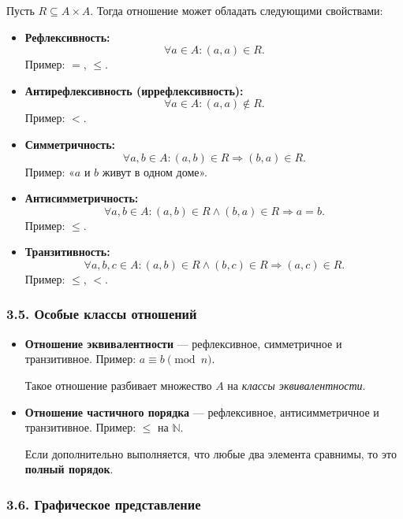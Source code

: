 Пусть $R \subseteq A \times A$. Тогда отношение может обладать следующими свойствами:

\begin{itemize}[leftmargin=*]
  \item \textbf{Рефлексивность:}
  \[
  \forall a \in A\colon (a,a) \in R.
  \]
  Пример: $=$, $\le$.

  \item \textbf{Антирефлексивность (иррефлексивность):}
  \[
  \forall a \in A\colon (a,a) \notin R.
  \]
  Пример: $<$.

  \item \textbf{Симметричность:}
  \[
  \forall a,b \in A\colon (a,b) \in R \Rightarrow (b,a) \in R.
  \]
  Пример: «$a$ и $b$ живут в одном доме».

  \item \textbf{Антисимметричность:}
  \[
  \forall a,b \in A\colon (a,b)\in R \wedge (b,a)\in R \Rightarrow a = b.
  \]
  Пример: $\le$.

  \item \textbf{Транзитивность:}
  \[
  \forall a,b,c \in A\colon (a,b)\in R \wedge (b,c)\in R \Rightarrow (a,c)\in R.
  \]
  Пример: $\le$, $<$.
\end{itemize}

\subsubsection{3.5. Особые классы отношений}

\begin{itemize}[leftmargin=*]
  \item \textbf{Отношение эквивалентности} — рефлексивное, симметричное и транзитивное.  
  Пример: $a \equiv b \pmod{n}$.

  Такое отношение разбивает множество $A$ на \textit{классы эквивалентности}.

  \item \textbf{Отношение частичного порядка} — рефлексивное, антисимметричное и транзитивное.  
  Пример: $\le$ на $\mathbb{N}$.

  Если дополнительно выполняется, что любые два элемента сравнимы, то это \textbf{полный порядок}.
\end{itemize}

\subsubsection{3.6. Графическое представление}

